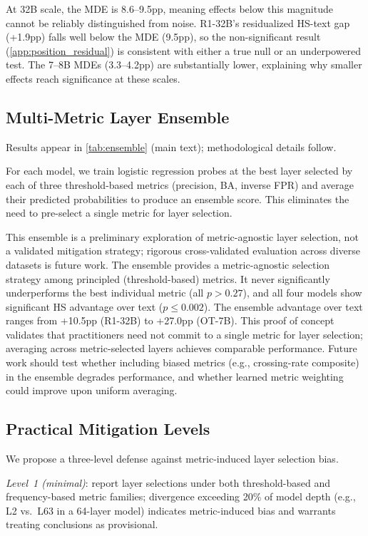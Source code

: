 At 32B scale, the MDE is 8.6--9.5pp, meaning effects below this magnitude cannot be reliably distinguished from noise. R1-32B's residualized HS-text gap (+1.9pp) falls well below the MDE (9.5pp), so the non-significant result (\cref{app:position_residual}) is consistent with either a true null or an underpowered test. The 7--8B MDEs (3.3--4.2pp) are substantially lower, explaining why smaller effects reach significance at these scales.

\subsection{Multi-Metric Layer Ensemble}
\label{app:ensemble}

Results appear in \cref{tab:ensemble} (main text); methodological details follow.

For each model, we train logistic regression probes at the best layer selected by each of three threshold-based metrics (precision, BA, inverse FPR) and average their predicted probabilities to produce an ensemble score. This eliminates the need to pre-select a single metric for layer selection.

This ensemble is a preliminary exploration of metric-agnostic layer selection, not a validated mitigation strategy; rigorous cross-validated evaluation across diverse datasets is future work. The ensemble provides a metric-agnostic selection strategy among principled (threshold-based) metrics. It never significantly underperforms the best individual metric (all $p > 0.27$), and all four models show significant HS advantage over text ($p \leq 0.002$). The ensemble advantage over text ranges from +10.5pp (R1-32B) to +27.0pp (OT-7B). This proof of concept validates that practitioners need not commit to a single metric for layer selection; averaging across metric-selected layers achieves comparable performance. Future work should test whether including biased metrics (e.g., crossing-rate composite) in the ensemble degrades performance, and whether learned metric weighting could improve upon uniform averaging.

\subsection{Practical Mitigation Levels}
\label{app:practical_mitigation}

We propose a three-level defense against metric-induced layer selection bias.

\emph{Level~1 (minimal)}: report layer selections under both threshold-based and frequency-based metric families; divergence exceeding 20\% of model depth (e.g., L2 vs.\ L63 in a 64-layer model) indicates metric-induced bias and warrants treating conclusions as provisional.

